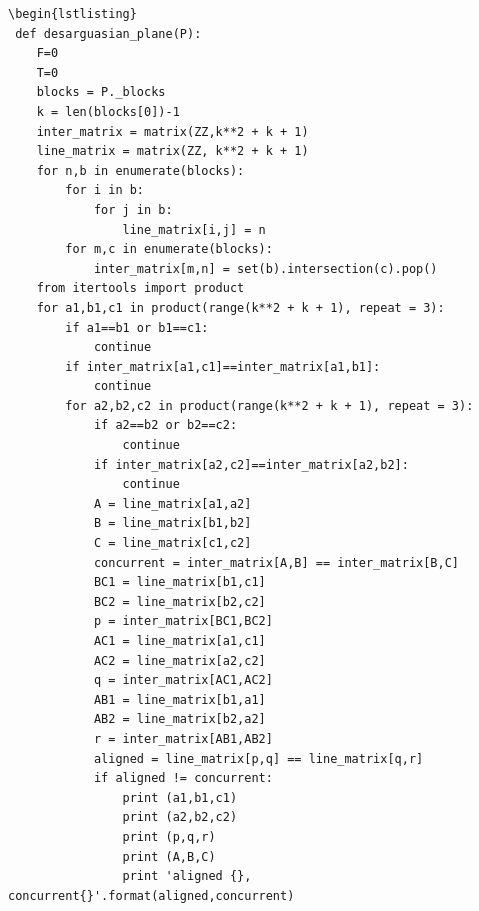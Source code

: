 \documentclass[a4paper]{article}
\begin{document}
\begin{lstlisting}
\begin{lstlisting}
 def desarguasian_plane(P):
    F=0
    T=0
    blocks = P._blocks
    k = len(blocks[0])-1
    inter_matrix = matrix(ZZ,k**2 + k + 1)
    line_matrix = matrix(ZZ, k**2 + k + 1)
    for n,b in enumerate(blocks):
        for i in b:
            for j in b:
                line_matrix[i,j] = n
        for m,c in enumerate(blocks):
            inter_matrix[m,n] = set(b).intersection(c).pop()
    from itertools import product
    for a1,b1,c1 in product(range(k**2 + k + 1), repeat = 3):
        if a1==b1 or b1==c1:
            continue
        if inter_matrix[a1,c1]==inter_matrix[a1,b1]:
            continue
        for a2,b2,c2 in product(range(k**2 + k + 1), repeat = 3):
            if a2==b2 or b2==c2:
                continue
            if inter_matrix[a2,c2]==inter_matrix[a2,b2]:
                continue
            A = line_matrix[a1,a2]
            B = line_matrix[b1,b2]
            C = line_matrix[c1,c2]
            concurrent = inter_matrix[A,B] == inter_matrix[B,C]
            BC1 = line_matrix[b1,c1]
            BC2 = line_matrix[b2,c2]
            p = inter_matrix[BC1,BC2]
            AC1 = line_matrix[a1,c1]
            AC2 = line_matrix[a2,c2]
            q = inter_matrix[AC1,AC2]
            AB1 = line_matrix[b1,a1]
            AB2 = line_matrix[b2,a2]
            r = inter_matrix[AB1,AB2]
            aligned = line_matrix[p,q] == line_matrix[q,r]
            if aligned != concurrent:
                print (a1,b1,c1)
                print (a2,b2,c2)
                print (p,q,r)
                print (A,B,C)
                print 'aligned {}, concurrent{}'.format(aligned,concurrent)
\end{lstlisting}
\end{document}
